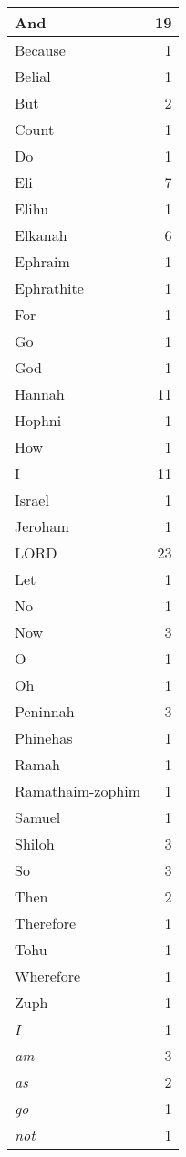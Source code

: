 \begin{center}
\begin{longtable}{l|r}
\hline \hline
\endlastfoot
And & 19 \\ \hline
Because & 1 \\ \hline
Belial & 1 \\ \hline
But & 2 \\ \hline
Count & 1 \\ \hline
Do & 1 \\ \hline
Eli & 7 \\ \hline
Elihu & 1 \\ \hline
Elkanah & 6 \\ \hline
Ephraim & 1 \\ \hline
Ephrathite & 1 \\ \hline
For & 1 \\ \hline
Go & 1 \\ \hline
God & 1 \\ \hline
Hannah & 11 \\ \hline
Hophni & 1 \\ \hline
How & 1 \\ \hline
I & 11 \\ \hline
Israel & 1 \\ \hline
Jeroham & 1 \\ \hline
LORD & 23 \\ \hline
Let & 1 \\ \hline
No & 1 \\ \hline
Now & 3 \\ \hline
O & 1 \\ \hline
Oh & 1 \\ \hline
Peninnah & 3 \\ \hline
Phinehas & 1 \\ \hline
Ramah & 1 \\ \hline
Ramathaim-zophim & 1 \\ \hline
Samuel & 1 \\ \hline
Shiloh & 3 \\ \hline
So & 3 \\ \hline
Then & 2 \\ \hline
Therefore & 1 \\ \hline
Tohu & 1 \\ \hline
Wherefore & 1 \\ \hline
Zuph & 1 \\ \hline
\emph{I} & 1 \\ \hline
\emph{am} & 3 \\ \hline
\emph{as} & 2 \\ \hline
\emph{go} & 1 \\ \hline
\emph{not} & 1 \\ \hline

\end{longtable}
\end{center}
